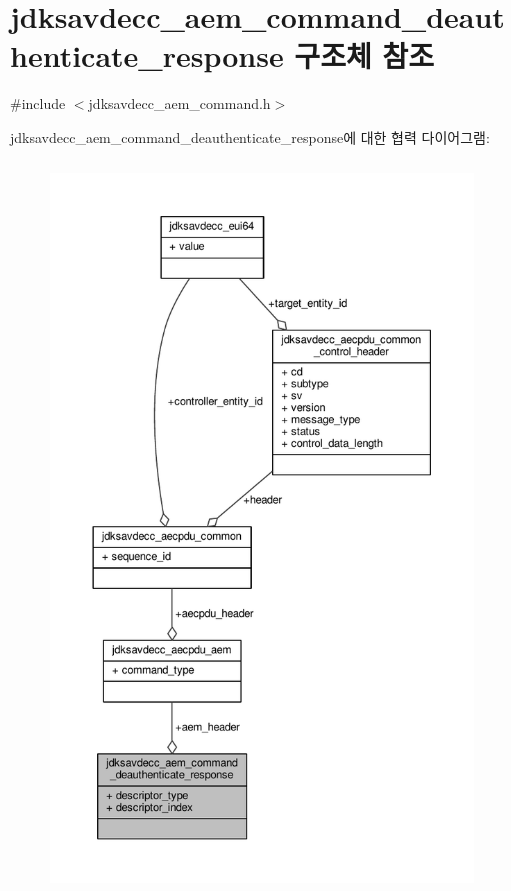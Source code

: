 \hypertarget{structjdksavdecc__aem__command__deauthenticate__response}{}\section{jdksavdecc\+\_\+aem\+\_\+command\+\_\+deauthenticate\+\_\+response 구조체 참조}
\label{structjdksavdecc__aem__command__deauthenticate__response}


{\ttfamily \#include $<$jdksavdecc\+\_\+aem\+\_\+command.\+h$>$}



jdksavdecc\+\_\+aem\+\_\+command\+\_\+deauthenticate\+\_\+response에 대한 협력 다이어그램\+:
\nopagebreak
\begin{figure}[H]
\begin{center}
\leavevmode
\includegraphics[height=550pt]{structjdksavdecc__aem__command__deauthenticate__response__coll__graph}
\end{center}
\end{figure}
